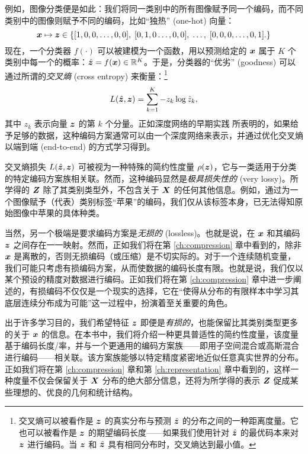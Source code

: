 \documentclass[../../book-main.tex]{subfiles}
\begin{document}
\begin{example}
例如，图像分类便是如此：我们将同一类别中的所有图像赋予同一个编码，而不同类别中的图像则赋予不同的编码，比如“独热” (one-hot) 向量：
\begin{equation}
  \bm{x} \mapsto \bm{z} \in \{  [1, 0, 0, \ldots , 0, 0], \;  [0, 1, 0 \ldots, 0, 0], \; \ldots, \;  [0,0,0, \ldots, 0, 1].\}
  \label{eqn:class-labels}
\end{equation}
现在，一个分类器 $f(\cdot)$ 可以被建模为一个函数，用以预测给定的 $\bm{x}$ 属于 $K$ 个类别中每一个的概率：$\hat{\bm{z}} = f(\bm{x}) \in \mathbb{R}^K$。于是，分类器的“优劣” (goodness) 可以通过所谓的{\em 交叉熵} (cross entropy) 来衡量：\footnote{交叉熵可以被看作是 $\bm{z}$ 的真实分布与预测 $\hat{\bm{z}}$ 的分布之间的一种距离度量。它也可以被看作是 $\bm{z}$ 的期望编码长度——如果我们使用针对 $\hat{\bm{z}}$ 的最优码本来对 $\bm{z}$ 进行编码。当 $\bm{z}$ 和 $\hat{\bm{z}}$ 具有相同分布时，交叉熵达到最小值。}
\begin{equation}
    L(\hat{\bm{z}}, \bm{z}) = \sum_{k=1}^K - z_k \log \hat{z}_k,
\end{equation}
其中 $z_k$ 表示向量 $\bm{z}$ 的第 $k$ 个分量。正如深度网络的早期实践 \cite{krizhevsky2012imagenet} 所表明的，如果给予足够的数据，这种编码方案通常可以由一个深度网络来表示，并通过优化交叉熵以端到端 (end-to-end) 的方式学习得到。
\end{example}

交叉熵损失 $L(\hat {\bm{z}}, \bm{z})$ 可被视为一种特殊的简约性度量 $\rho(\bm{z})$，它与一类适用于分类的特定编码方案族相关联。然而，这种编码显然是{\em 极具损失性的} (very lossy)。所学得的 $\bm{Z}$ 除了其类别类型外，不包含关于 $\bm{X}$ 的任何其他信息。例如，通过为一个图像赋予（代表）类别标签“苹果”的编码，我们仅从该标签本身，已无法得知原始图像中苹果的具体种类。

当然，另一个极端是要求编码方案是{\em 无损的} (lossless)。也就是说，在 $\bm{x}$ 和其编码 $\bm{z}$ 之间存在一一映射。然而，正如我们将在第 \ref{ch:compression} 章中看到的，除非 $\bm{x}$ 是离散的，否则无损编码（或压缩）是不切实际的。对于一个连续随机变量，我们可能只考虑有损编码方案，从而使数据的编码长度有限。也就是说，我们仅以某个预设的精度对数据进行编码。正如我们将在第 \ref{ch:compression} 章中进一步阐述的，有损编码不仅仅是一个现实的选择，它在“使得从分布的有限样本中学习其底层连续分布成为可能”这一过程中，扮演着至关重要的角色。

出于许多学习目的，我们希望特征 $\bm{z}$ 即便是{\em 有损的}，也能保留比其类别类型更多的关于 $\bm{x}$ 的信息。在本书中，我们将介绍一种更具普适性的简约性度量，该度量基于编码长度/率，并与一个更通用的编码方案族——即用子空间混合或高斯混合进行编码——相关联。该方案族能够以特定精度紧密地近似任意真实世界的分布。正如我们将在第 \ref{ch:compression} 章和第 \ref{ch:representation} 章中看到的，这样一种度量不仅会保留关于 $\bm{X}$ 分布的绝大部分信息，还将为所学得的表示 $\bm{Z}$ 促成某些理想的、优良的几何和统计结构。
\end{document}
